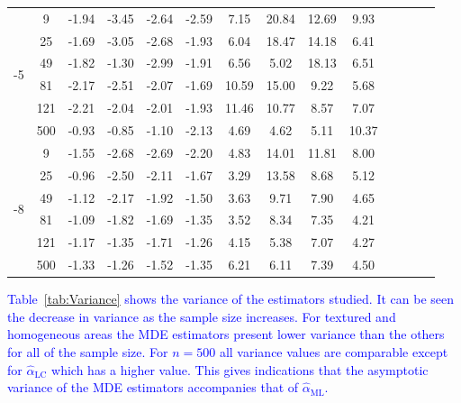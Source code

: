 \documentclass[twocolumn]{svjour3}
\begin{document}
\begin{table}[htbp]
\begin{tabular}{cc c*3{S[table-format=3.2]}  c*3{S[table-format=3.2]} @{\hskip 6mm} c*3{S[table-format=2.2]}}
		\cmidrule(r){1-6} \cmidrule(r){7-10} \cmidrule(r){11-14}
		[2]{*}{-5} 
		&9     & -1.94 & -3.45 & -2.64 & -2.59 & 7.15  & 20.84 & 12.69 & 9.93 \\
		&25    & -1.69 & -3.05 & -2.68 & -1.93 & 6.04  & 18.47 & 14.18 & 6.41 \\
		&49    & -1.82 & -1.30 & -2.99 & -1.91 & 6.56  & 5.02  & 18.13 & 6.51 \\
		&81    & -2.17 & -2.51 & -2.07 & -1.69 & 10.59 & 15.00 & 9.22  & 5.68 \\
		&121   & -2.21 & -2.04 & -2.01 & -1.93 & 11.46 & 10.77 & 8.57  & 7.07 \\
		&500   & -0.93 & -0.85 & -1.10 & -2.13 & 4.69  & 4.62  & 5.11  & 10.37 \\		
		\cmidrule(r){1-6} \cmidrule(r){7-10} \cmidrule(r){11-14}
		[2]{*}{-8} 
		&9     & -1.55 & -2.68 & -2.69 & -2.20 & 4.83  & 14.01 & 11.81 & 8.00 \\
		&25    & -0.96 & -2.50 & -2.11 & -1.67 & 3.29  & 13.58 & 8.68  & 5.12 \\
		&49    & -1.12 & -2.17 & -1.92 & -1.50 & 3.63  & 9.71  & 7.90  & 4.65 \\
		&81    & -1.09 & -1.82 & -1.69 & -1.35 & 3.52  & 8.34  & 7.35  & 4.21 \\
		&121   & -1.17 & -1.35 & -1.71 & -1.26 & 4.15  & 5.38  & 7.07  & 4.27 \\
		&500   & -1.33 & -1.26 & -1.52 & -1.35 & 6.21  & 6.11  & 7.39  & 4.50 \\
		\bottomrule
	\end{tabular}%
	\label{tab:SkewKurt}%
\end{table}%


\textcolor{blue}{
Table~\ref{tab:Variance} shows the variance of the estimators studied. It can be seen the decrease in variance as the sample size increases. For textured and homogeneous areas the MDE estimators present lower variance than the others for all of the sample size. For $n=500$ all variance values are comparable except for $\widehat{\alpha}_{\text{{LC}}}$ which has a higher value. This gives indications that the asymptotic variance of the MDE estimators accompanies that of $\widehat{\alpha}_{\text{{ML}}}$.
}
\end{document}
